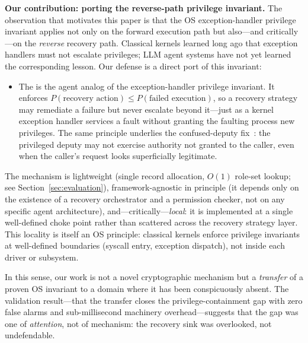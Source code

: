 \textbf{Our contribution: porting the reverse-path privilege invariant.} The observation that motivates this paper is that the OS exception-handler privilege invariant applies not only on the forward execution path but also---and critically---on the \emph{reverse} recovery path. Classical kernels learned long ago that exception handlers must not escalate privileges; LLM agent systems have not yet learned the corresponding lesson. Our defense is a direct port of this invariant:

\begin{itemize}[leftmargin=*]
    \item The \reauthgate{} is the agent analog of the exception-handler privilege invariant. It enforces $P(\text{recovery action}) \leq P(\text{failed execution})$, so a recovery strategy may remediate a failure but never escalate beyond it---just as a kernel exception handler services a fault without granting the faulting process new privileges. The same principle underlies the confused-deputy fix~\cite{hardy1988confused}: the privileged deputy may not exercise authority not granted to the caller, even when the caller's request looks superficially legitimate.
\end{itemize}

The mechanism is lightweight (single record allocation, $O(1)$ role-set lookup; see Section~\ref{sec:evaluation}), framework-agnostic in principle (it depends only on the existence of a recovery orchestrator and a permission checker, not on any specific agent architecture), and---critically---\emph{local}: it is implemented at a single well-defined choke point rather than scattered across the recovery strategy layer. This locality is itself an OS principle: classical kernels enforce privilege invariants at well-defined boundaries (syscall entry, exception dispatch), not inside each driver or subsystem.

In this sense, our work is not a novel cryptographic mechanism but a \emph{transfer} of a proven OS invariant to a domain where it has been conspicuously absent. The validation result---that the transfer closes the privilege-containment gap with zero false alarms and sub-millisecond machinery overhead---suggests that the gap was one of \emph{attention}, not of mechanism: the recovery sink was overlooked, not undefendable.
